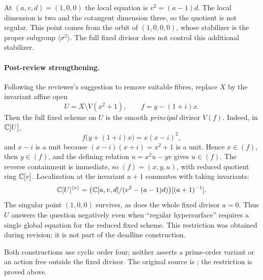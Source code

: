 At \((a,v,d)=(1,0,0)\) the local equation is
\(v^2=(a-1)d\). The local dimension is two and the
cotangent dimension three, so the quotient is not
regular. This point comes from the orbit of
\((1,0,0,0)\), whose stabilizer is the proper subgroup
\(\langle\sigma^2\rangle\). The full fixed divisor
does not control this additional stabilizer.

\paragraph{Post-review strengthening.}
Following the reviewer's suggestion to remove suitable fibres, replace
\(X\) by the invariant affine open
\[
 U=X\setminus V(x^2+1),\qquad f=y-(1+i)x.
\]
Then the full fixed scheme on \(U\) is the smooth \emph{principal}
divisor \(V(f)\). Indeed, in \(\mathbb C[U]\),
\[
 f\bigl(y+(1+i)x\bigr)=x(x-i)^2,
\]
and \(x-i\) is a unit because \((x-i)(x+i)=x^2+1\) is a unit.
Hence \(x\in(f)\), then \(y\in(f)\), and the defining relation
\(u=x^2u-yv\) gives \(u\in(f)\). The reverse containment is immediate,
so \((f)=(x,y,u)\), with reduced quotient ring \(\mathbb C[v]\).
Localization at the invariant \(a+1\) commutes with taking invariants:
\[
 \mathbb C[U]^{\langle\sigma\rangle}
 =\bigl(\mathbb C[a,v,d]/(v^2-(a-1)d)\bigr)[(a+1)^{-1}].
\]
The singular point \((1,0,0)\) survives, as does the whole fixed
divisor \(a=0\). Thus \(U\) answers the question negatively even
when ``regular hypersurface'' requires a single global equation for
the reduced fixed scheme. This restriction was obtained during revision;
it is not part of the deadline construction.

Both constructions use cyclic order four; neither asserts a prime-order
variant or an action free outside the fixed divisor. The original source
is ; the restriction is proved above.

